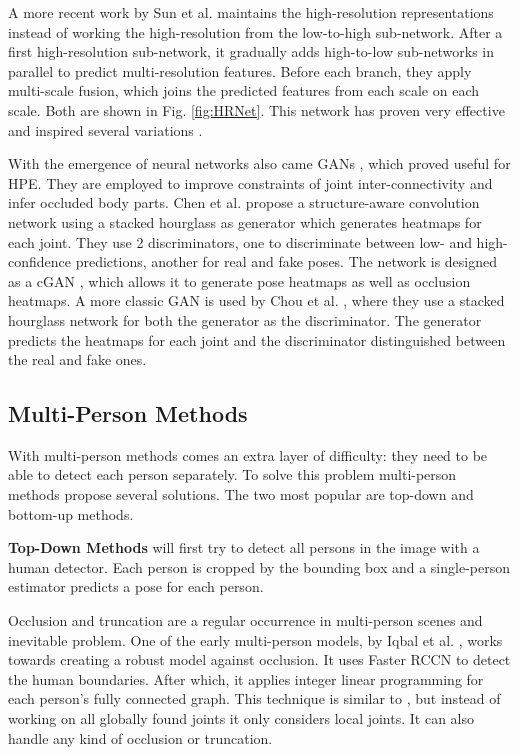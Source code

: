 A more recent work by Sun et al. \cite{Sun2019} maintains the high-resolution representations instead of working the high-resolution from the low-to-high sub-network.
After a first high-resolution sub-network, it gradually adds high-to-low sub-networks in parallel to predict multi-resolution features.
Before each branch, they apply multi-scale fusion, which joins the predicted features from each scale on each scale.
Both are shown in Fig. \ref{fig:HRNet}.
This network has proven very effective and inspired several variations \cite{Cheng2019, Yu2021, Yuan2021}.

With the emergence of neural networks also came \glspl{GAN} \cite{Goodfellow2014}, which proved useful for \gls{HPE}.
They are employed to improve constraints of joint inter-connectivity and infer occluded body parts.
Chen et al. \cite{Chen2017} propose a structure-aware convolution network using a stacked hourglass as generator which generates heatmaps for each joint.
They use 2 discriminators, one to discriminate between low- and high-confidence predictions, another for real and fake poses.
The network is designed as a \gls{cGAN} \cite{Mirza2014}, which allows it to generate pose heatmaps as well as occlusion heatmaps.
A more classic \gls{GAN} is used by Chou et al. \cite{Chou2017}, where they use a stacked hourglass network for both the generator as the discriminator.
The generator predicts the heatmaps for each joint and the discriminator distinguished between the real and fake ones.

\subsection{Multi-Person Methods}
With multi-person methods comes an extra layer of difficulty: they need to be able to detect each person separately.
To solve this problem multi-person methods propose several solutions. 
The two most popular are top-down and bottom-up methods.

\textbf{Top-Down Methods} will first try to detect all persons in the image with a human detector.
Each person is cropped by the bounding box and a single-person estimator predicts a pose for each person.

Occlusion and truncation are a regular occurrence in multi-person scenes and inevitable problem.
One of the early multi-person models, by Iqbal et al. \cite{Iqbal2016}, works towards creating a robust model against occlusion.
It uses Faster RCCN \cite{Ren2015} to detect the human boundaries.
After which, it applies integer linear programming for each person's fully connected graph.
This technique is similar to \cite{Pishchulin2015}, but instead of working on all globally found joints it only considers local joints.
It can also handle any kind of occlusion or truncation.

